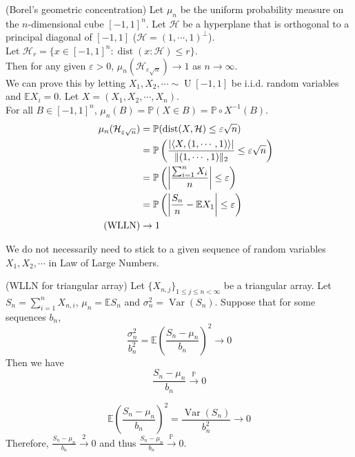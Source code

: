 \documentclass{huhtakm-template-book}
\newcommand{\prob}{\mathbb{P}}
\newcommand{\expect}{\mathbb{E}}
\DeclareMathOperator{\U}{U}
\DeclareMathOperator{\Var}{Var}
\DeclareMathOperator{\dist}{dist}
\begin{document}
\begin{eg}(Borel's geometric concentration)
	Let $\mu_{n}$ be the uniform probability measure on the $n$-dimensional cube $[-1,1]^{n}$. Let $\mathcal{H}$ be a hyperplane that is orthogonal to a principal diagonal of $[-1,1]$ ($\mathcal{H}=(1,\cdots,1)^{\perp}$).\\
	Let $\mathcal{H}_{r}=\{x\in[-1,1]^{n}:\dist(x:\mathcal{H})\leq r\}$.\\
	Then for any given $\varepsilon>0$, $\mu_{n}(\mathcal{H}_{\varepsilon\sqrt{n}})\to 1$ as $n\to\infty$.\\
	We can prove this by letting $X_{1},X_{2},\cdots\sim\U[-1,1]$ be i.i.d. random variables and $\expect X_{i}=0$. Let $X=(X_{1},X_{2},\cdots,X_{n})$.\\
	For all $B\in[-1,1]^{n}$, $\mu_{n}(B)=\prob(X\in B)=\prob\circ X^{-1}(B)$.
	\begin{align*}
		\mu_{n}(\mathcal{H}_{\varepsilon\sqrt{n}})&=\prob(\dist(X,\mathcal{H})\leq\varepsilon\sqrt{n})\\
		&=\prob\left(\frac{\abs{\left<X,(1,\cdots,1)\right>}}{\norm{(1,\cdots,1)}_{2}}\leq\varepsilon\sqrt{n}\right)\\
		&=\prob\left(\abs{\frac{\sum_{i=1}^{n}X_{i}}{n}}\leq\varepsilon\right)\\
		&=\prob\left(\abs{\frac{S_{n}}{n}-\expect X_{1}}\leq\varepsilon\right)\\
		\tag{WLLN}
		&\to 1
	\end{align*}
\end{eg}
We do not necessarily need to stick to a given sequence of random variables $X_{1},X_{2},\cdots$ in Law of Large Numbers.
\begin{thm}(WLLN for triangular array)
	Let $\{X_{n,j}\}_{1\leq j\leq n<\infty}$ be a triangular array. Let $S_{n}=\sum_{i=1}^{n}X_{n,i}$, $\mu_{n}=\expect S_{n}$ and $\sigma_{n}^{2}=\Var(S_{n})$. Suppose that for some sequences $b_{n}$,
	\begin{equation*}
		\frac{\sigma_{n}^{2}}{b_{n}^{2}}=\expect\left(\frac{S_{n}-\mu_{n}}{b_{n}}\right)^{2}\to 0
	\end{equation*}
	Then we have
	\begin{equation*}
		\frac{S_{n}-\mu_{n}}{b_{n}}\xrightarrow{\prob}0
	\end{equation*}
\end{thm}
\begin{proofing}
	\begin{equation*}
		\expect\left(\frac{S_{n}-\mu_{n}}{b_{n}}\right)^{2}=\frac{\Var(S_{n})}{b_{n}^{2}}\to 0
	\end{equation*}
	Therefore, $\frac{S_{n}-\mu_{n}}{b_{n}}\xrightarrow{2}0$ and thus $\frac{S_{n}-\mu_{n}}{b_{n}}\xrightarrow{\prob}0$.
\end{proofing}
\end{document}
